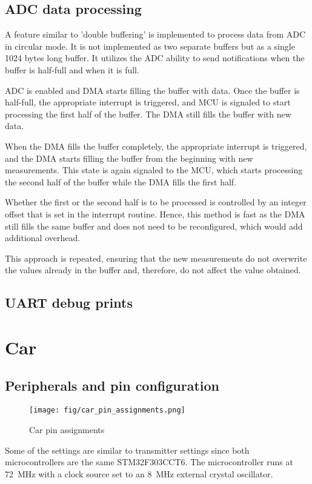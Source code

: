 \subsection{ADC data processing}
\label{sub:adc}
A feature similar to 'double buffering' is implemented to process data from ADC in circular mode. It is not implemented as two separate buffers but as a single 1024 bytes long buffer. It utilizes the ADC ability to send notifications when the buffer is half-full and when it is full.

ADC is enabled and DMA starts filling the buffer with data. Once the buffer is half-full, the appropriate interrupt is triggered, and MCU is signaled to start processing the first half of the buffer. The DMA still fills the buffer with new data.

When the DMA fills the buffer completely, the appropriate interrupt is triggered, and the DMA starts filling the buffer from the beginning with new measurements. This state is again signaled to the MCU, which starts processing the second half of the buffer while the DMA fills the first half.

Whether the first or the second half is to be processed is controlled by an integer offset that is set in the interrupt routine. Hence, this method is fast as the DMA still fills the same buffer and does not need to be reconfigured, which would add additional overhead.

This approach is repeated, ensuring that the new measurements do not overwrite the values already in the buffer and, therefore, do not affect the value obtained.

\subsection{UART debug prints}
\todo




\section{Car}
\subsection{Peripherals and pin configuration}
\begin{figure}[t]
\centering
\texttt{[image: fig/car\_pin\_assignments.png]}
\caption{Car pin assignments}
\label{fig:car_conf}
\end{figure}
Some of the settings are similar to transmitter settings since both microcontrollers are the same STM32F303CCT6. The microcontroller runs at \SI{72}{\MHz} with a clock source set to an \SI{8}{\MHz} external crystal oscillator.

